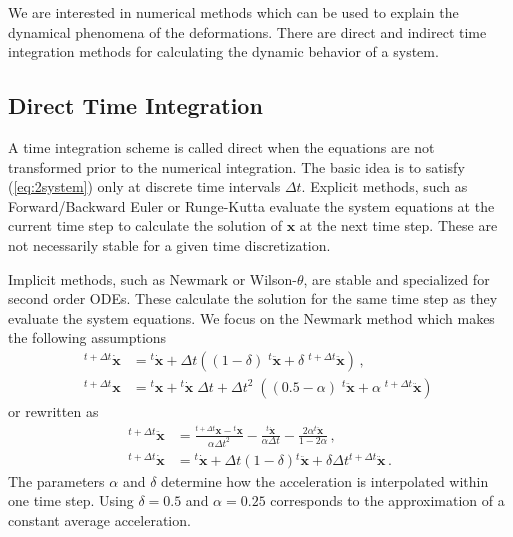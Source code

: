 \documentclass[conference]{journal}%
\newcommand{\B}[1]{\mathbf{#1}}
\newcommand{\Bx}{\B{x}}
\newcommand{\xt}{{}^{t}\Bx}
\newcommand{\vt}{{}^{t}\dot{\Bx}}
\newcommand{\at}{{}^{t}\ddot{\Bx}}
\newcommand{\xtt}{{}^{t+\Delta t}\Bx}
\newcommand{\vtt}{{}^{t+\Delta t}\dot{\Bx}}
\newcommand{\att}{{}^{t+\Delta t}\ddot{\Bx}}
\begin{document}
	We are interested in numerical methods which can be used to explain the dynamical phenomena of the deformations. There are direct and indirect time integration methods for calculating the dynamic behavior of a system.


	\subsection{Direct Time Integration}
	A time integration scheme is called direct when the equations are not transformed prior to the numerical integration. The basic idea is to satisfy (\ref{eq:2system}) only at discrete time intervals $\Delta t$. Explicit methods, such as Forward/Backward Euler or Runge-Kutta evaluate the system equations at the current time step to calculate the solution of $\Bx$ at the next time step. These are not necessarily stable for a given time discretization.

	Implicit methods, such as Newmark or Wilson-$\theta$, are stable and specialized for second order ODEs. These calculate the solution for the same time step as they evaluate the system equations. We focus on the Newmark method which makes the following assumptions
	\begin{equation} \label{eq:2newmark-asump}
	\begin{aligned}
	\vtt &= \vt 
	+ \Delta t \left((1-\delta)\; \at + \delta\;\att \right)\,,
	\\[.5em]
	\xtt &= \xt + \vt\;\Delta t
	+ \Delta t^2\;\left((0.5-\alpha) \; \at + \alpha\;\att \right)\,
	\end{aligned}
	\end{equation}
	or rewritten as
	\begin{equation} \label{eq:2newmark-asump-re}
	\begin{aligned}
	\att &= \frac{\xtt - \xt}{\alpha \Delta t^2} - \frac{\vt}{\alpha \Delta t} - \frac{2 \alpha \at}{1 - 2\alpha}\,,
	\\[.5em]
	\vtt &= \vt + \Delta t (1-\delta) \at + \delta \Delta t \att\,.
	\end{aligned}
	\end{equation}
	The parameters $\alpha$ and $\delta$ determine how the acceleration is interpolated within one time step. Using $\delta=0.5$ and $\alpha=0.25$ corresponds to the approximation of a constant average acceleration.
	
\end{document}

